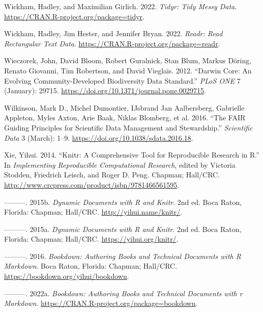 \documentclass[
]{book}
\newlength{\cslhangindent}
\newlength{\cslentryspacingunit} %
\newenvironment{CSLReferences}[2] %
 {%
  \setlength{\parindent}{0pt}
  \ifodd #1
  \let\oldpar\par
  \def\par{\hangindent=\cslhangindent\oldpar}
  \fi
  \setlength{\parskip}{#2\cslentryspacingunit}
 }%
 {}
\begin{document}
\begin{CSLReferences}{1}{0}
\leavevmode{}%
Wickham, Hadley, and Maximilian Girlich. 2022. \emph{Tidyr: Tidy Messy Data}. \url{https://CRAN.R-project.org/package=tidyr}.

\leavevmode{}%
Wickham, Hadley, Jim Hester, and Jennifer Bryan. 2022. \emph{Readr: Read Rectangular Text Data}. \url{https://CRAN.R-project.org/package=readr}.

\leavevmode{}%
Wieczorek, John, David Bloom, Robert Guralnick, Stan Blum, Markus Döring, Renato Giovanni, Tim Robertson, and David Vieglais. 2012. {``Darwin Core: An Evolving Community-Developed Biodiversity Data Standard.''} \emph{PLoS ONE} 7 (January): 29715. \url{https://doi.org/10.1371/journal.pone.0029715}.

\leavevmode{}%
Wilkinson, Mark D., Michel Dumontier, IJsbrand Jan Aalbersberg, Gabrielle Appleton, Myles Axton, Arie Baak, Niklas Blomberg, et al. 2016. {``The FAIR Guiding Principles for Scientific Data Management and Stewardship.''} \emph{Scientific Data} 3 (March): 1--9. \url{https://doi.org/10.1038/sdata.2016.18}.

\leavevmode{}%
Xie, Yihui. 2014. {``Knitr: A Comprehensive Tool for Reproducible Research in {R}.''} In \emph{Implementing Reproducible Computational Research}, edited by Victoria Stodden, Friedrich Leisch, and Roger D. Peng. Chapman; Hall/CRC. \url{http://www.crcpress.com/product/isbn/9781466561595}.

\leavevmode{}%
---------. 2015b. \emph{Dynamic Documents with {R} and Knitr}. 2nd ed. Boca Raton, Florida: Chapman; Hall/CRC. \url{http://yihui.name/knitr/}.

\leavevmode{}%
---------. 2015a. \emph{Dynamic Documents with {R} and Knitr}. 2nd ed. Boca Raton, Florida: Chapman; Hall/CRC. \url{https://yihui.org/knitr/}.

\leavevmode{}%
---------. 2016. \emph{Bookdown: Authoring Books and Technical Documents with {R} Markdown}. Boca Raton, Florida: Chapman; Hall/CRC. \url{https://bookdown.org/yihui/bookdown}.

\leavevmode{}%
---------. 2022a. \emph{Bookdown: Authoring Books and Technical Documents with r Markdown}. \url{https://CRAN.R-project.org/package=bookdown}.


\end{CSLReferences}
\end{document}
